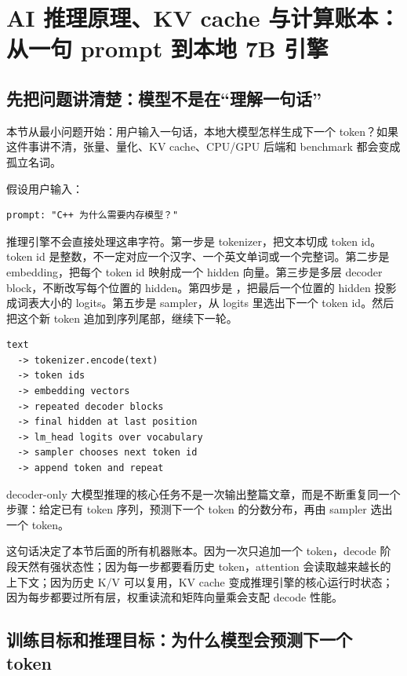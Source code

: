 \section{AI 推理原理、KV cache 与计算账本：从一句 prompt 到本地 7B 引擎}

\subsection{先把问题讲清楚：模型不是在“理解一句话”}

本节从最小问题开始：用户输入一句话，本地大模型怎样生成下一个 token？如果这件事讲不清，张量、量化、KV cache、CPU/GPU 后端和 benchmark 都会变成孤立名词。

假设用户输入：

\begin{lstlisting}[numbers=none,caption={一个最小生成请求}]
prompt: "C++ 为什么需要内存模型？"
\end{lstlisting}

推理引擎不会直接处理这串字符。第一步是 tokenizer，把文本切成 token id。token id 是整数，不一定对应一个汉字、一个英文单词或一个完整词。第二步是 embedding，把每个 token id 映射成一个 hidden 向量。第三步是多层 decoder block，不断改写每个位置的 hidden。第四步是 ，把最后一个位置的 hidden 投影成词表大小的 logits。第五步是 sampler，从 logits 里选出下一个 token id。然后把这个新 token 追加到序列尾部，继续下一轮。

\begin{lstlisting}[numbers=none,caption={从 prompt 到 next token 的主链路}]
text
  -> tokenizer.encode(text)
  -> token ids
  -> embedding vectors
  -> repeated decoder blocks
  -> final hidden at last position
  -> lm_head logits over vocabulary
  -> sampler chooses next token id
  -> append token and repeat
\end{lstlisting}

\begin{keyidea}
decoder-only 大模型推理的核心任务不是一次输出整篇文章，而是不断重复同一个步骤：给定已有 token 序列，预测下一个 token 的分数分布，再由 sampler 选出一个 token。
\end{keyidea}

这句话决定了本节后面的所有机器账本。因为一次只追加一个 token，decode 阶段天然有强状态性；因为每一步都要看历史 token，attention 会读取越来越长的上下文；因为历史 K/V 可以复用，KV cache 变成推理引擎的核心运行时状态；因为每步都要过所有层，权重读流和矩阵向量乘会支配 decode 性能。

\subsection{训练目标和推理目标：为什么模型会预测下一个 token}

